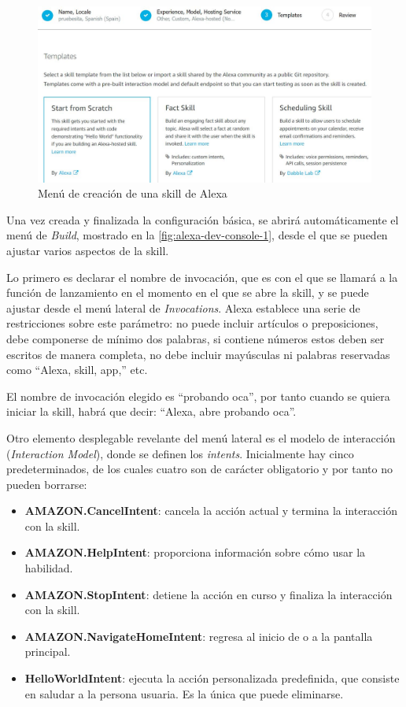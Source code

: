 \begin{figure}[H]
	\centering
	\includegraphics[width=1\textwidth]{imgs/alexa-dev-console-2.jpg}
	\caption{Menú de creación de una skill de Alexa}
	\label{fig:alexa-dev-console-2}
\end{figure}

Una vez creada y finalizada la configuración básica, se abrirá automáticamente el menú de \textit{Build}, mostrado en la \autoref{fig:alexa-dev-console-1}, desde el que se pueden ajustar varios aspectos de la skill.

Lo primero es declarar el nombre de invocación, que es con el que se llamará a la función de lanzamiento en el momento en el que se abre la skill, y se puede ajustar desde el menú lateral de \textit{Invocations}. Alexa establece una serie de restricciones sobre este parámetro: no puede incluir artículos o preposiciones, debe componerse de mínimo dos palabras, si contiene números estos deben ser escritos de manera completa, no debe incluir mayúsculas ni palabras reservadas como \enquote{Alexa, skill, app,} etc. 

El nombre de invocación elegido es \enquote{probando oca}, por tanto cuando se quiera iniciar la skill, habrá que decir: \enquote{Alexa, abre probando oca}.

Otro elemento desplegable revelante del menú lateral es el modelo de interacción (\textit{Interaction Model}), donde se definen los \textit{intents}. Inicialmente hay cinco predeterminados, de los cuales cuatro son de carácter obligatorio y por tanto no pueden borrarse:

\begin{itemize}
	\item \textbf{AMAZON.CancelIntent}: cancela la acción actual y termina la interacción con la skill.
	\item \textbf{AMAZON.HelpIntent}: proporciona información sobre cómo usar la habilidad.
	\item \textbf{AMAZON.StopIntent}: detiene la acción en curso y finaliza la interacción con la skill.
	\item \textbf{AMAZON.NavigateHomeIntent}: regresa al inicio de o a la pantalla principal.
	\item \textbf{HelloWorldIntent}: ejecuta la acción personalizada predefinida, que consiste en saludar a la persona usuaria. Es la única que puede eliminarse.
\end{itemize}

